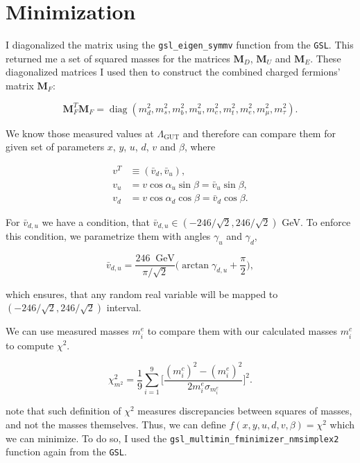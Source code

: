 \documentclass[12pt, a4paper]{article}
\newcommand{\diag}{
	\operatorname{diag}
}
\renewcommand{\ni}{
	\noindent
}
\newcommand{\M}{
	\ensuremath{\mathbf{M}}
}
\begin{document}
\section{Minimization}

I diagonalized the matrix using the {\tt gsl\_eigen\_symmv} function from the {\tt GSL}. This returned me
a set of squared masses for the matrices $\M_D$, $\M_U$ and $\M_E$. These diagonalized matrices I used then
to construct the combined charged fermions' matrix $\M_F$:

\begin{equation}
	\M_F^T \M_F = \diag (m_d^2, m_s^2, m_b^2, m_u^2, m_c^2, m_t^2, m_e^2, m_\mu^2, m_\tau^2).
\end{equation}

We know those measured values at $\Lambda_\text{GUT}$ and therefore can compare them for given set of parameters
$x$, $y$, $u$, $d$, $v$ and $\beta$, where

\begin{align*}
	v^T &\equiv (\bar{v}_d, \bar{v}_u), \\
	v_u &= v\cos\alpha_u\sin\beta = \bar{v}_u\sin\beta, \\
	v_d &= v\cos\alpha_d\cos\beta = \bar{v}_d\cos\beta.
\end{align*}

\ni For $\bar{v}_{d,u}$ we have a condition, that $\bar{v}_{d,u} \in (-246/\sqrt{2}, 246/\sqrt{2})$ GeV. To enforce this
condition, we parametrize them with angles $\gamma_u$ and $\gamma_d$,

\[
	\bar{v}_{d,u} = \frac{246\ \text{ GeV}}{\pi/\sqrt{2}}\bigg(\arctan \gamma_{d,u} +
		\frac{\pi}{2}\bigg),
\]

\ni which ensures, that any random real variable will be mapped to $(-246/\sqrt{2}, 246/\sqrt{2})$ interval.

We can use measured masses $m_i^e$ to compare them with our calculated masses $m_i^c$ to compute $\chi^2$.

\begin{equation}
	\chi^2_{m^2} = \frac{1}{9}\sum_{i=1}^9 \bigg[\frac{(m_i^c)^2 - (m_i^e)^2}{2m_i^e\sigma_{m_i^e}}\bigg]^2.
\end{equation}

\ni note that such definition of $\chi^2$ measures discrepancies between squares of masses, and not the masses
themselves. Thus, we can define $f(x,y,u,d,v,\beta) = \chi^2$ which we can minimize. To do so, I used the
{\tt gsl\_multimin\_fminimizer\_nmsimplex2} function again from the {\tt GSL}.
\end{document}
